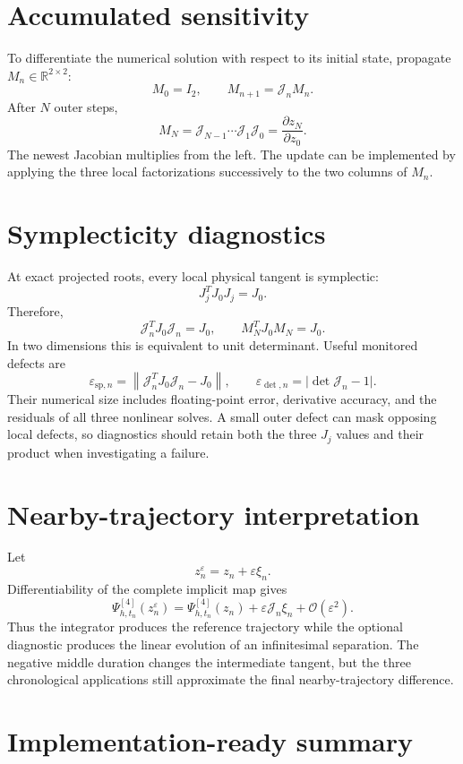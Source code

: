 \documentclass[11pt,a4paper]{article}
\newcommand{\R}{\mathbb{R}}
\newcommand{\Id}{I}
\newcommand{\norm}[1]{\left\lVert #1\right\rVert}
\begin{document}
\section{Accumulated sensitivity}

To differentiate the numerical solution with respect to its initial state,
propagate $M_n\in\R^{2\times2}$:
\[
 M_0=\Id_2,
 \qquad
 \boxed{M_{n+1}=\mathcal J_nM_n.}
\]
After $N$ outer steps,
\[
 M_N=\mathcal J_{N-1}\cdots\mathcal J_1\mathcal J_0
 =\frac{\partial z_N}{\partial z_0}.
\]
The newest Jacobian multiplies from the left.  The update can be implemented
by applying the three local factorizations successively to the two columns of
$M_n$.

\section{Symplecticity diagnostics}

At exact projected roots, every local physical tangent is symplectic:
\[
 J_j^TJ_0J_j=J_0.
\]
Therefore,
\[
 \mathcal J_n^TJ_0\mathcal J_n=J_0,
 \qquad
 M_N^TJ_0M_N=J_0.
\]
In two dimensions this is equivalent to unit determinant.  Useful monitored
defects are
\[
 \varepsilon_{\mathrm{sp},n}
 =\norm{\mathcal J_n^TJ_0\mathcal J_n-J_0},
 \qquad
 \varepsilon_{\det,n}=\lvert\det\mathcal J_n-1\rvert.
\]
Their numerical size includes floating-point error, derivative accuracy, and
the residuals of all three nonlinear solves.  A small outer defect can mask
opposing local defects, so diagnostics should retain both the three $J_j$
values and their product when investigating a failure.

\section{Nearby-trajectory interpretation}

Let
\[
 z_n^\varepsilon=z_n+\varepsilon\xi_n.
\]
Differentiability of the complete implicit map gives
\[
 \Psi^{[4]}_{h,t_n}(z_n^\varepsilon)
 =\Psi^{[4]}_{h,t_n}(z_n)
 +\varepsilon\mathcal J_n\xi_n+\mathcal O(\varepsilon^2).
\]
Thus the integrator produces the reference trajectory while the optional
diagnostic produces the linear evolution of an infinitesimal separation.  The
negative middle duration changes the intermediate tangent, but the three
chronological applications still approximate the final nearby-trajectory
difference.

\section{Implementation-ready summary}
\end{document}
